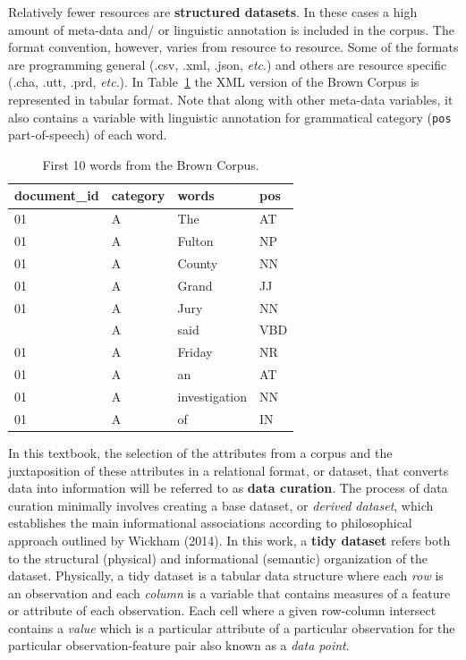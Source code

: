 \documentclass[
  letterpaper,
]{latex/krantz}
\begin{document}
Relatively fewer resources are \textbf{structured datasets}. In these
cases a high amount of meta-data and/ or linguistic annotation is
included in the corpus. The format convention, however, varies from
resource to resource. Some of the formats are programming general (.csv,
.xml, .json, \emph{etc}.) and others are resource specific (.cha, .utt,
.prd, \emph{etc}.). In Table~\ref{tbl-structure-brown} the XML version
of the Brown Corpus is represented in tabular format. Note that along
with other meta-data variables, it also contains a variable with
linguistic annotation for grammatical category (\texttt{pos}
part-of-speech) of each word.

\hypertarget{tbl-structure-brown}{}
\begin{table}
\caption{\label{tbl-structure-brown}First 10 words from the Brown Corpus. }\tabularnewline

\centering
\begin{tabular}{llll}
\toprule
document\_id & category & words & pos\\
\midrule
01 & A & The & AT\\
01 & A & Fulton & NP\\
01 & A & County & NN\\
01 & A & Grand & JJ\\
01 & A & Jury & NN\\
\addlinespace
01 & A & said & VBD\\
01 & A & Friday & NR\\
01 & A & an & AT\\
01 & A & investigation & NN\\
01 & A & of & IN\\
\bottomrule
\end{tabular}
\end{table}

In this textbook, the selection of the attributes from a corpus and the
juxtaposition of these attributes in a relational format, or dataset,
that converts data into information will be referred to as \textbf{data
curation}. The process of data curation minimally involves creating a
base dataset, or \emph{derived dataset}, which establishes the main
informational associations according to philosophical approach outlined
by Wickham (2014). In this work, a \textbf{tidy dataset} refers both to
the structural (physical) and informational (semantic) organization of
the dataset. Physically, a tidy dataset is a tabular data structure
where each \emph{row} is an observation and each \emph{column} is a
variable that contains measures of a feature or attribute of each
observation. Each cell where a given row-column intersect contains a
\emph{value} which is a particular attribute of a particular observation
for the particular observation-feature pair also known as a \emph{data
point}.
\end{document}
